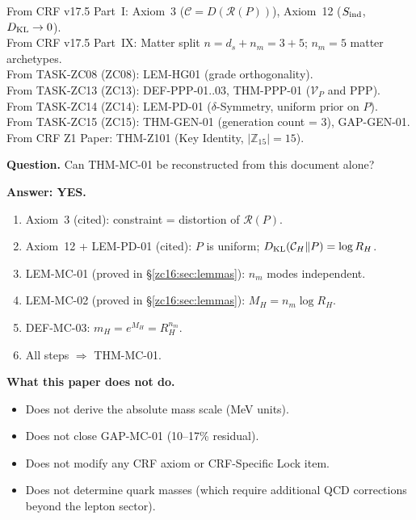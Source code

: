 \documentclass[12pt, a4paper]{article}
\begin{document}
\begin{formalbox}[title={Atomic units inherited (not modified)}]
From CRF v17.5 Part~I: Axiom~3 ($\mathcal{C} = D(\mathcal{R}(P))$),
  Axiom~12 ($S_{\rm ind}$, $D_{\rm KL} \to 0$). \\
From CRF v17.5 Part~IX: Matter split $n = d_s + n_m = 3+5$;
  $n_m = 5$ matter archetypes. \\
From TASK-ZC08 (ZC08): LEM-HG01 (grade orthogonality). \\
From TASK-ZC13 (ZC13): DEF-PPP-01..03, THM-PPP-01
  ($\mathcal{V}_P$ and PPP). \\
From TASK-ZC14 (ZC14): LEM-PD-01 ($\delta$-Symmetry,
  uniform prior on $P$). \\
From TASK-ZC15 (ZC15): THM-GEN-01 (generation count = 3),
  GAP-GEN-01. \\
From CRF Z1 Paper: THM-Z101 (Key Identity,
  $|\mathbb{Z}_{15}| = 15$).
\end{formalbox}

\begin{formalbox}[title={Reconstruction Test (CUIP No-Loss)}]
\textbf{Question.} Can THM-MC-01 be reconstructed from this
document alone?

\textbf{Answer: YES.}
\begin{enumerate}[leftmargin=*, noitemsep]
  \item Axiom~3 (cited): constraint = distortion of $\mathcal{R}(P)$.
  \item Axiom~12 + LEM-PD-01 (cited): $P$ is uniform;
    $D_{\rm KL}(\mathcal{C}_H \| P) = \log R_H$.
  \item LEM-MC-01 (proved in \S\ref{zc16:sec:lemmas}):
    $n_m$ modes independent.
  \item LEM-MC-02 (proved in \S\ref{zc16:sec:lemmas}):
    $M_H = n_m \log R_H$.
  \item DEF-MC-03: $m_H = e^{M_H} = R_H^{n_m}$.
  \item All steps $\Rightarrow$ THM-MC-01.
\end{enumerate}

\textbf{What this paper does not do.}
\begin{itemize}[leftmargin=*, noitemsep]
  \item Does not derive the absolute mass scale (MeV units).
  \item Does not close GAP-MC-01 (10--17\% residual).
  \item Does not modify any CRF axiom or CRF-Specific Lock item.
  \item Does not determine quark masses (which require additional
    QCD corrections beyond the lepton sector).
\end{itemize}
\end{formalbox}
\end{document}
